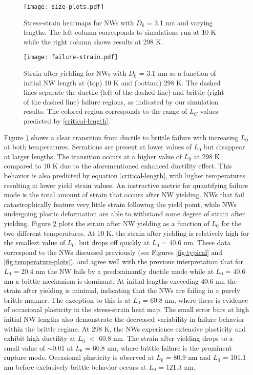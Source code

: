 \documentclass[10pt]{report}  %
\newcommand\findent{\hspace*{\parindent}}
\begin{document}
\begin{figure}[h!]
       \centering
	\texttt{[image: size-plots.pdf]}
	\caption{Stress-strain heatmaps for NWs with $D_{0}$ = 3.1 nm and varying lengths. The left column corresponds to simulations run at 10 K while the right column shows results at 298 K.  }
	\label{fig:size-plots}
\end{figure}

\begin{figure}[h!]
       \centering
	\texttt{[image: failure-strain.pdf]}
	\caption{Strain after yielding for NWs with $D_{0}$ = 3.1 nm as a function of initial NW length at (top) 10 K and (bottom) 298 K. The dashed lines separate the ductile (left of the dashed line) and brittle (right of the dashed line) failure regions, as indicated by our simulation results. The colored region corresponds to the range of $L_{C}$ values predicted by \ref{critical-length}.  }
	\label{fig:failure-minus-yield-strain}
\end{figure}

\findent Figure \ref{fig:size-plots} shows a clear transition from ductile to brittle failure with increasing $L_{0}$ at both temperatures. Serrations are present at lower values of $L_{0}$ but disappear at larger lengths. The transition occurs at a higher value of $L_{0}$ at 298 K compared to 10 K due to the aforementioned enhanced ductility effect. This behavior is also predicted by equation \ref{critical-length}, with higher temperatures resulting in lower yield strain values. An instructive metric for quantifying failure mode is the total amount of strain that occurs after NW yielding. NWs that fail catastrophically feature very little strain following the yield point, while NWs undergoing plastic deformation are able to withstand some degree of strain after yielding. Figure \ref{fig:failure-minus-yield-strain} plots the strain after NW yielding as a function of $L_{0}$ for the two different temperatures. At 10 K, the strain after yielding is relatively high for the smallest value of $L_{0}$, but drops off quickly at $L_{0}$ = 40.6 nm. These data correspond to the NWs discussed previously (see Figures \ref{fig:typical} and \ref{fig:temperature-plots}), and agree well with the previous interpretation that for $L_{0}$ = 20.4 nm the NW fails by a predominantly ductile mode while at $L_{0}$ = 40.6 nm a brittle mechanism is dominant. At initial lengths exceeding 40.6 nm the strain after yielding is minimal, indicating that the NWs are failing in a purely brittle manner. The exception to this is at $L_{0}$ = 60.8 nm, where there is evidence of occasional plasticity in the stress-strain heat map. The small error bars at high initial NW lengths also demonstrate the decreased variability in failure behavior within the brittle regime. At 298 K, the NWs experience extensive plasticity and exhibit high ductility at $L_{0}$ $<$ 60.8 nm. The strain after yielding drops to a small value of $\sim$0.01 at $L_{0}$ = 60.8 nm, where brittle failure is the prominent rupture mode. Occasional plasticity is observed at $L_{0}$ = 80.9 nm and $L_{0}$ = 101.1 nm before exclusively brittle behavior occurs at $L_{0}$ = 121.3 nm.
\end{document}
